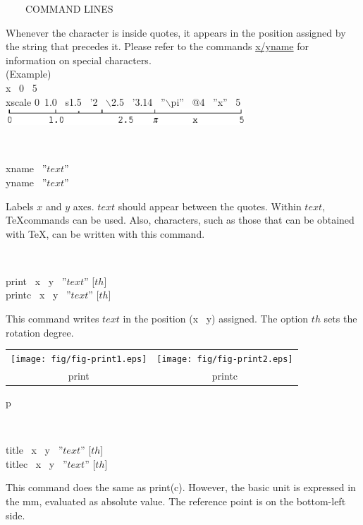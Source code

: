\begin{qsection}{\ ~~~COMMAND LINES}
\begin{minipage}[t]{9cm}
Whenever the character is inside quotes,
it appears in the position assigned
by the string that precedes it.
Please refer to the commands \hyperlink{xyname}{x/yname} for information on
special characters.\\
(Example)\\
x ~0 ~5\\
xscale 0~1.0 ~s1.5 ~'2 ~$\backslash$2.5 ~'3.14 ~''$\backslash$pi'' ~@4 ~''x'' ~5\\

\includegraphics[width=9cm]{fig/scale.eps}
\end{minipage}\\

\hypertarget{xyname}{}
\begin{minipage}[t]{5.5cm}
xname ~''$text$''\\
yname ~''$text$''\\
\end{minipage}
\begin{minipage}[t]{9cm}
Labels $x$ and $y$ axes.
$text$ should appear between the quotes.
Within $text$, \TeX commands can be used.
Also, characters, such as those that can be obtained
with \TeX, can be written with this command.
\end{minipage}\\

\begin{minipage}[t]{5.5cm}
 print ~x ~y ~''$text$'' [$th$]\\
 printc ~x ~y ~''$text$'' [$th$]
\end{minipage}
\begin{minipage}[t]{9cm}
This command writes $text$ in the position (x ~y) assigned.
The option $th$ sets the rotation degree.

\begin{tabular}{cc}
\texttt{[image: fig/fig-print1.eps]}&  
\texttt{[image: fig/fig-print2.eps]}\\
print&printc
\end{tabular}p
\end{minipage}\\

\begin{minipage}[t]{5.5cm}
title ~x ~y ~''$text$'' [$th$]\\
titlec ~x ~y ~''$text$'' [$th$]
\end{minipage}
\begin{minipage}[t]{9cm}
This command does the same as print(c).
However, the basic unit is expressed in the mm, evaluated as absolute value.
The reference point is on the bottom-left side.
\end{minipage}\\


\end{qsection}
